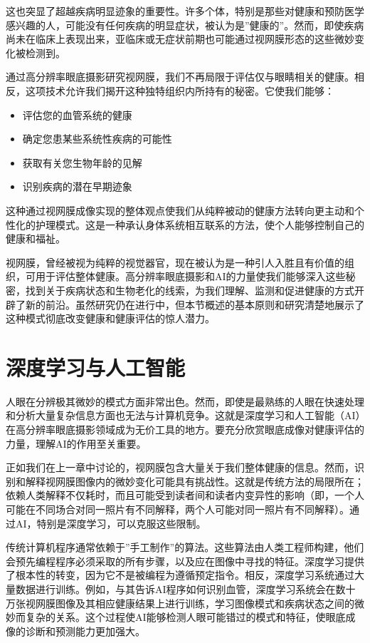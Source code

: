 \documentclass[
  Letterpaper,
]{scrbook}
\providecommand{\tightlist}{%
  \setlength{\itemsep}{0pt}\setlength{\parskip}{0pt}}\usepackage{longtable,booktabs,array}
\begin{document}
这也突显了超越疾病明显迹象的重要性。许多个体，特别是那些对健康和预防医学感兴趣的人，可能没有任何疾病的明显症状，被认为是''健康的''。然而，即使疾病尚未在临床上表现出来，亚临床或无症状前期也可能通过视网膜形态的这些微妙变化被检测到。

通过高分辨率眼底摄影研究视网膜，我们不再局限于评估仅与眼睛相关的健康。相反，这项技术允许我们揭开这种独特组织内所持有的秘密。它使我们能够：

\begin{itemize}
\tightlist
\item
  评估您的血管系统的健康
\item
  确定您患某些系统性疾病的可能性
\item
  获取有关您生物年龄的见解
\item
  识别疾病的潜在早期迹象
\end{itemize}

这种通过视网膜成像实现的整体观点使我们从纯粹被动的健康方法转向更主动和个性化的护理模式。这是一种承认身体系统相互联系的方法，使个人能够控制自己的健康和福祉。

视网膜，曾经被视为纯粹的视觉器官，现在被认为是一种引人入胜且有价值的组织，可用于评估整体健康。高分辨率眼底摄影和AI的力量使我们能够深入这些秘密，找到关于疾病状态和生物老化的线索，为我们理解、监测和促进健康的方式开辟了新的前沿。虽然研究仍在进行中，但本节概述的基本原则和研究清楚地展示了这种模式彻底改变健康和健康评估的惊人潜力。

\section{深度学习与人工智能}\label{ux6df1ux5ea6ux5b66ux4e60ux4e0eux4ebaux5de5ux667aux80fd}

人眼在分辨极其微妙的模式方面非常出色。然而，即使是最熟练的人眼在快速处理和分析大量复杂信息方面也无法与计算机竞争。这就是深度学习和人工智能（AI）在高分辨率眼底摄影领域成为无价工具的地方。要充分欣赏眼底成像对健康评估的力量，理解AI的作用至关重要。

正如我们在上一章中讨论的，视网膜包含大量关于我们整体健康的信息。然而，识别和解释视网膜图像内的微妙变化可能具有挑战性。这就是传统方法的局限所在；依赖人类解释不仅耗时，而且可能受到读者间和读者内变异性的影响（即，一个人可能在不同场合对同一照片有不同解释，两个人可能对同一照片有不同解释）。通过AI，特别是深度学习，可以克服这些限制。

传统计算机程序通常依赖于''手工制作''的算法。这些算法由人类工程师构建，他们会预先编程程序必须采取的所有步骤，以及应在图像中寻找的特征。深度学习提供了根本性的转变，因为它不是被编程为遵循预定指令。相反，深度学习系统通过大量数据进行训练。例如，与其告诉AI程序如何识别血管，深度学习系统会在数十万张视网膜图像及其相应健康结果上进行训练，学习图像模式和疾病状态之间的微妙而复杂的关系。这个过程使AI能够检测人眼可能错过的模式和特征，使眼底成像的诊断和预测能力更加强大。
\end{document}

